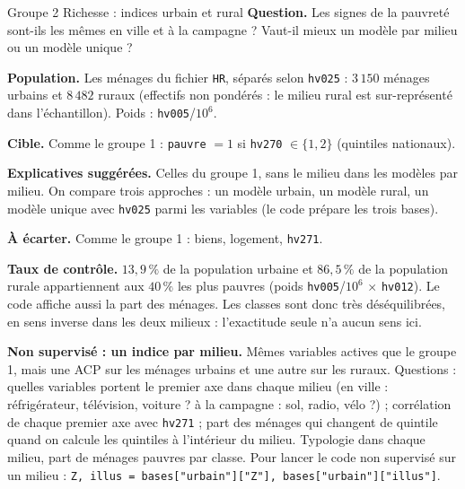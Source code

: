 \documentclass[11pt]{article}
\begin{document}
\begin{fiche}{Groupe 2 \textendash{} Richesse : indices urbain et rural}
\textbf{Question.} Les signes de la pauvreté sont-ils les mêmes en ville et à la campagne ? Vaut-il mieux un modèle par milieu ou un modèle unique ?

\textbf{Population.} Les ménages du fichier \texttt{HR}, séparés selon \texttt{hv025} : $3\,150$ ménages urbains et $8\,482$ ruraux (effectifs non pondérés : le milieu rural est sur-représenté dans l'échantillon). Poids : \texttt{hv005}/$10^6$.

\textbf{Cible.} Comme le groupe 1 : \texttt{pauvre} $=1$ si \texttt{hv270} $\in\{1,2\}$ (quintiles nationaux).

\textbf{Explicatives suggérées.} Celles du groupe 1, sans le milieu dans les modèles par milieu. On compare trois approches : un modèle urbain, un modèle rural, un modèle unique avec \texttt{hv025} parmi les variables (le code prépare les trois bases).

\textbf{À écarter.} Comme le groupe 1 : biens, logement, \texttt{hv271}.

\textbf{Taux de contrôle.} $13{,}9\,\%$ de la population urbaine et $86{,}5\,\%$ de la population rurale appartiennent aux $40\,\%$ les plus pauvres (poids \texttt{hv005}/$10^6$ $\times$ \texttt{hv012}). Le code affiche aussi la part des ménages. Les classes sont donc très déséquilibrées, en sens inverse dans les deux milieux : l'exactitude seule n'a aucun sens ici.

\textbf{Non supervisé : un indice par milieu.} Mêmes variables actives que le groupe 1, mais une ACP sur les ménages urbains et une autre sur les ruraux. Questions : quelles variables portent le premier axe dans chaque milieu (en ville : réfrigérateur, télévision, voiture ? à la campagne : sol, radio, vélo ?) ; corrélation de chaque premier axe avec \texttt{hv271} ; part des ménages qui changent de quintile quand on calcule les quintiles à l'intérieur du milieu. Typologie dans chaque milieu, part de ménages pauvres par classe. Pour lancer le code non supervisé sur un milieu : \texttt{Z, illus = bases["urbain"]["Z"], bases["urbain"]["illus"]}.
\end{fiche}

\end{document}

